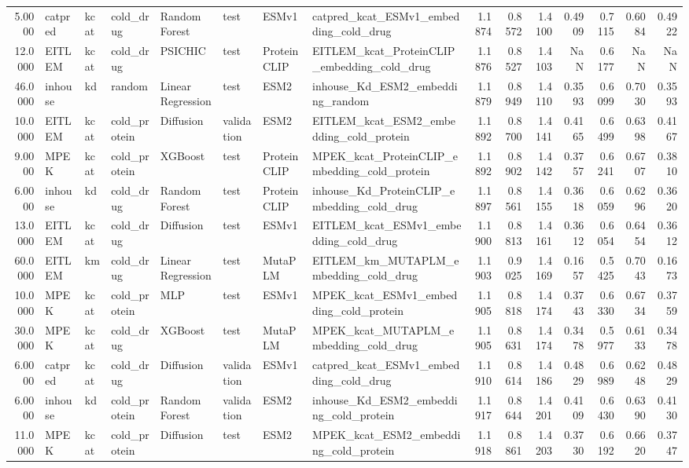 \begin{tabular}{rlllllllrrrrrrr}
5.0000 & catpred & kcat & cold_drug & Random Forest & test & ESMv1 & catpred_kcat_ESMv1_embedding_cold_drug & 1.1874 & 0.8572 & 1.4100 & 0.4909 & 0.7115 & 0.6084 & 0.4922 \\
12.0000 & EITLEM & kcat & cold_drug & PSICHIC & test & ProteinCLIP & EITLEM_kcat_ProteinCLIP_embedding_cold_drug & 1.1876 & 0.8527 & 1.4103 & NaN & 0.6177 & NaN & NaN \\
46.0000 & inhouse & kd & random & Linear Regression & test & ESM2 & inhouse_Kd_ESM2_embedding_random & 1.1879 & 0.8949 & 1.4110 & 0.3593 & 0.6099 & 0.7030 & 0.3593 \\
10.0000 & EITLEM & kcat & cold_protein & Diffusion & validation & ESM2 & EITLEM_kcat_ESM2_embedding_cold_protein & 1.1892 & 0.8700 & 1.4141 & 0.4165 & 0.6499 & 0.6398 & 0.4167 \\
9.0000 & MPEK & kcat & cold_protein & XGBoost & test & ProteinCLIP & MPEK_kcat_ProteinCLIP_embedding_cold_protein & 1.1892 & 0.8902 & 1.4142 & 0.3757 & 0.6241 & 0.6707 & 0.3810 \\
6.0000 & inhouse & kd & cold_drug & Random Forest & test & ProteinCLIP & inhouse_Kd_ProteinCLIP_embedding_cold_drug & 1.1897 & 0.8561 & 1.4155 & 0.3618 & 0.6059 & 0.6296 & 0.3620 \\
13.0000 & EITLEM & kcat & cold_drug & Diffusion & test & ESMv1 & EITLEM_kcat_ESMv1_embedding_cold_drug & 1.1900 & 0.8813 & 1.4161 & 0.3612 & 0.6054 & 0.6454 & 0.3612 \\
60.0000 & EITLEM & km & cold_drug & Linear Regression & test & MutaPLM & EITLEM_km_MUTAPLM_embedding_cold_drug & 1.1903 & 0.9025 & 1.4169 & 0.1657 & 0.5425 & 0.7043 & 0.1673 \\
10.0000 & MPEK & kcat & cold_protein & MLP & test & ESMv1 & MPEK_kcat_ESMv1_embedding_cold_protein & 1.1905 & 0.8818 & 1.4174 & 0.3743 & 0.6330 & 0.6734 & 0.3759 \\
30.0000 & MPEK & kcat & cold_drug & XGBoost & test & MutaPLM & MPEK_kcat_MUTAPLM_embedding_cold_drug & 1.1905 & 0.8631 & 1.4174 & 0.3478 & 0.5977 & 0.6133 & 0.3478 \\
6.0000 & catpred & kcat & cold_drug & Diffusion & validation & ESMv1 & catpred_kcat_ESMv1_embedding_cold_drug & 1.1910 & 0.8614 & 1.4186 & 0.4829 & 0.6989 & 0.6248 & 0.4829 \\
6.0000 & inhouse & kd & cold_protein & Random Forest & validation & ESM2 & inhouse_Kd_ESM2_embedding_cold_protein & 1.1917 & 0.8644 & 1.4201 & 0.4109 & 0.6430 & 0.6390 & 0.4130 \\
11.0000 & MPEK & kcat & cold_protein & Diffusion & test & ESM2 & MPEK_kcat_ESM2_embedding_cold_protein & 1.1918 & 0.8861 & 1.4203 & 0.3730 & 0.6192 & 0.6620 & 0.3747 \\

\end{tabular}
